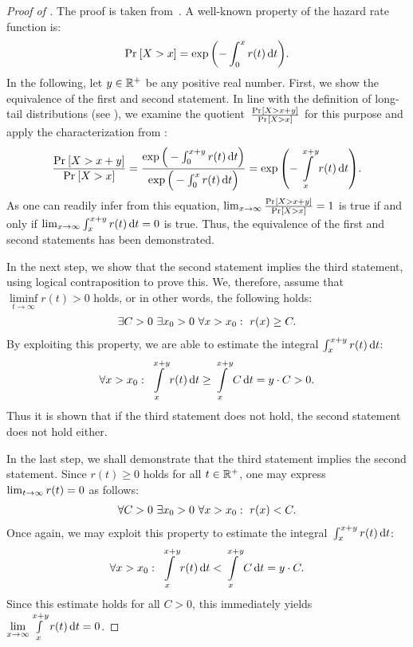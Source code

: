 \begin{proof}[Proof of ]
	The proof is taken from~\cite{nair2020fundamentals}. A well-known property of the hazard rate function is:
	\begin{align}
		\prob{X > x} = \exp{\left(-\integralLow[t]{0}{x}{r(t)}\right)}.\label{eq:hazard_rate_connection_survival}
	\end{align}
	In the following, let $y \in \Rpos$ be any positive real number. First, we show the equivalence of the first and second statement.
	In line with the definition of long-tail distributions (see ), we examine the quotient~$\frac{\prob{X > x+y}}{\prob{X>x}}$ for this purpose and apply the characterization from :
	\begin{align*}
		\frac{\prob{X > x+y}}
		{\prob{X > x}} =
		\frac{\exp{\Big(-\integralLow[t]{0}{x+y}{r(t)}\Big)}}
		{\exp{\Big(-\integralLow[t]{0}{x}{r(t)}\Big)}} =
		\exp{\left(-\integral[t]{x}{x+y}{r(t)}\right)}.
	\end{align*}
	As one can readily infer from this equation, \mbox{$\Lim{x} \frac{\prob{X > x+y}}{\prob{X>x}}=1$} is true if and only if \mbox{$\Lim{x} \integralLow[t]{x}{x+y}{r(t)} = 0$} is true. Thus, the equivalence of the first and second statements has been demonstrated.
	
	In the next step, we show that the second statement implies the third statement, using logical contraposition to prove this. We, therefore, assume that \mbox{$\liminf\limits_{t\rightarrow \infty}r(t) > 0$} holds, or in other words, the following holds:
	\begin{align*}
		\exists C>0 \quantorsep \exists x_0 > 0 \quantorsep \forall x > x_0: \quantorsep
		r(x) \geq C.
	\end{align*}
	By exploiting this property, we are able to estimate the integral \mbox{$\integralLow[t]{x}{x+y}{r(t)}$}:
	\begin{align*}
		\forall x > x_0:\quantorsep
		\integral[t]{x}{x+y}{r(t)} \geq \integral[t]{x}{x+y}{C} = y\cdot C > 0.
	\end{align*}
	Thus it is shown that if the third statement does not hold, the second statement does not hold either.
	
	In the last step, we shall demonstrate that the third statement implies the second statement. Since $r(t)\geq 0$ holds for all $t\in \Rpos$, one may express \mbox{$\Lim{t} r(t)=0$} as follows:
	\begin{align*}
		\forall C>0 \quantorsep \exists x_0 > 0 \quantorsep \forall x > x_0:\quantorsep
		r(x) < C.
	\end{align*}
	Once again, we may exploit this property to estimate the integral~\mbox{$\integralLow[t]{x}{x+y}{r(t)}$}:
	\begin{align*}
		\forall x > x_0:\quantorsep
		\integral[t]{x}{x+y}{r(t)} < \integral[t]{x}{x+y}{C} = y\cdot C.
	\end{align*}
	Since this estimate holds for all $C>0$, this immediately yields \mbox{$\LIM{x} \integral[t]{x}{x+y}{r(t)} = 0$}.
\end{proof}